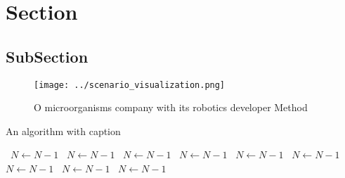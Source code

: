 \documentclass[a4paper]{article}
\begin{document}
\section{Section}

\subsection{SubSection}

\begin{figure}
\centering
\texttt{[image: ../scenario\_visualization.png]}
\caption{O microorganisms company with its robotics developer Method
}
\end{figure}
 
\begin{algorithm}
\caption{An algorithm with caption}
\begin{algorithmic}
\    \State $N \gets N - 1$
\    \State $N \gets N - 1$
\    \State $N \gets N - 1$
\    \State $N \gets N - 1$
\    \State $N \gets N - 1$
\    \State $N \gets N - 1$
\    \State $N \gets N - 1$
\    \State $N \gets N - 1$
\    \State $N \gets N - 1$
\EndWhile
\end{algorithmic}
\end{algorithm}
\end{document}
